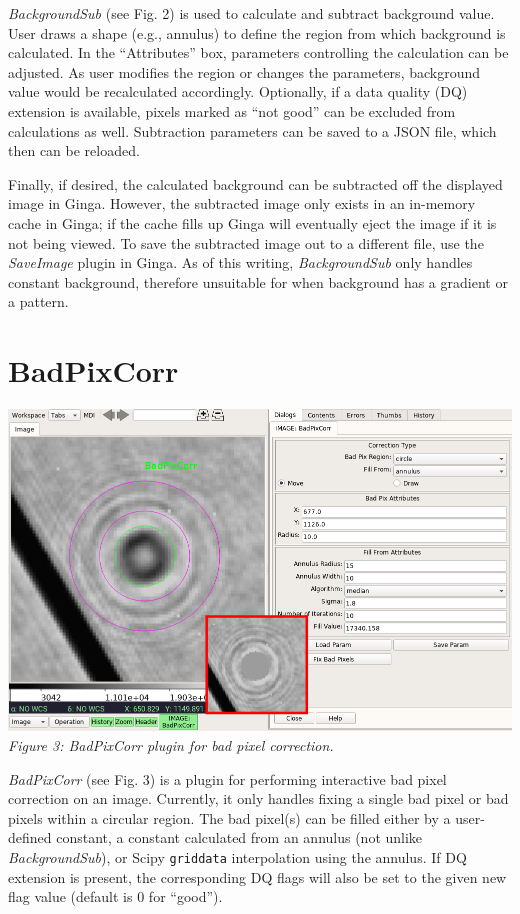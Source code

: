 \documentclass[]{article}
\begin{document}
\begin{multicols}{3}
\para
{\em BackgroundSub} (see Fig. 2) is used to calculate and subtract background
value. User draws a shape (e.g., annulus) to define
the region from which background is calculated. In the ``Attributes'' box,
parameters controlling the calculation can be adjusted.
As user modifies the region or changes the parameters, background value would
be recalculated accordingly.
Optionally, if a data quality (DQ) extension is available, pixels marked as
``not good'' can be excluded from calculations as well.
Subtraction parameters can be saved to a JSON file, which then can be reloaded.

\para
Finally, if desired, the calculated background can be subtracted off
the displayed image in Ginga.
However, the subtracted image only exists in an in-memory cache in Ginga;
if the cache fills up Ginga will eventually eject the image if it is not
being viewed.
To save the subtracted image out to a different file, use the {\em SaveImage}
plugin in Ginga.
As of this writing, {\em BackgroundSub} only handles constant
background, therefore unsuitable for when background has a gradient or a
pattern.

\section*{BadPixCorr}

\begin{center}
\includegraphics[width=8in]{plugin_badpixcorr.png}
\label{fig:plugin_badpixcorr}
\vspace*{0.4em}
{\small\em Figure 3: BadPixCorr plugin for bad pixel correction.}
\end{center}

\para
{\em BadPixCorr} (see Fig. 3) is a plugin for performing interactive bad pixel
correction on an image. Currently, it only handles fixing a single bad pixel or
bad pixels within a circular region.
The bad pixel(s) can be filled either by a user-defined constant, a constant
calculated from an annulus (not unlike {\em BackgroundSub}), or Scipy
{\tt griddata} interpolation using the annulus.
If DQ extension is present, the corresponding DQ flags will also be set
to the given new flag value (default is 0 for ``good'').


\end{multicols}
\end{document}
